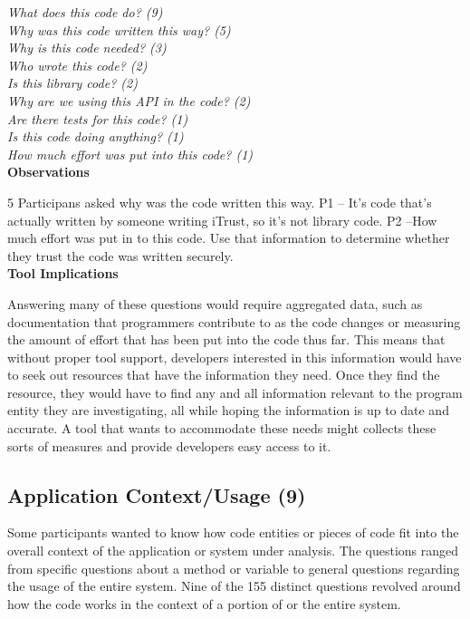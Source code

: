 \documentclass[conference]{IEEEtran}
\begin{document}
\noindent\emph{What does this code do? (9)} \\
\emph{Why was this code written this way? (5)} \\
\emph{Why is this code needed? (3)} \\
\emph{Who wrote this code? (2)} \\
\emph{Is this library code? (2)} \\
\emph{Why are we using this API in the code? (2)} \\
\emph{Are there tests for this code? (1)} \\
\emph{Is this code doing anything? (1)} \\
\emph{How much effort was put into this code? (1)} \\



\noindent\textbf{Observations}

5 Participans asked why was the code written this way.
P1 -- It's code that's actually written by someone writing iTrust, so it's not library code.
P2 --How much effort was put in to this code. Use that information to determine whether they trust the code was written securely.
\\

\noindent\textbf{Tool Implications}

Answering many of these questions would require aggregated data, such as documentation that programmers contribute to as the code changes or measuring the amount of effort that has been put into the code thus far.
This means that without proper tool support, developers interested in this information would have to seek out resources that have the information they need.
Once they find the resource, they would have to find any and all information relevant to the program entity they are investigating, all while hoping the information is up to date and accurate. 
A tool that wants to accommodate these needs might collects these sorts of measures and provide developers easy access to it.



\noindent\subsection{\textbf{Application Context/Usage (9)}}\label{acu}


Some participants wanted to know how code entities or pieces of code fit into the overall context of the application or system under analysis. 
The questions ranged from specific questions about a method or variable to general questions regarding the usage of the entire system. 
Nine of the 155 distinct questions revolved around how the code works in the context of a portion of or the entire system.
\\
\end{document}
